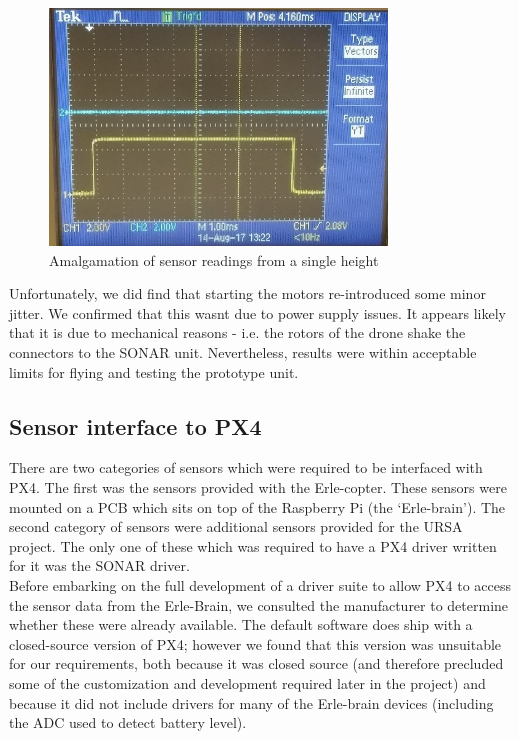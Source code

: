 \documentclass[capstone_report.tex]{subfiles}
\begin{document}
    \begin{figure}[H]
        \centering
        \includegraphics[width=0.8\textwidth]{imgs/pulseOk.jpg}
        \caption{Amalgamation of sensor readings from a single height\label{fig:goodSig}}
    \end{figure}

Unfortunately, we did find that starting the motors re-introduced some minor jitter. We confirmed that this wasnt due to power supply issues. It appears likely that it is due to mechanical reasons - i.e. the rotors of the drone shake the connectors to the SONAR unit. Nevertheless, results were within acceptable limits for flying and testing the prototype unit.


    \subsection{Sensor interface to PX4}
    There are two categories of sensors which were required to be interfaced with PX4. The first was the sensors provided with the Erle-copter. These sensors were mounted on a PCB which sits on top of the Raspberry Pi (the `Erle-brain'). The second category of sensors were additional sensors provided for the URSA project. The only one of these which was required to have a PX4 driver written for it was the SONAR driver.\\

    Before embarking on the full development of a driver suite to allow PX4 to access the sensor data from the Erle-Brain, we consulted the manufacturer to determine whether these were already available. The default software does ship with a closed-source version of PX4; however we found that this version was unsuitable for our requirements, both because it was closed source (and therefore precluded some of the customization and development required later in the project) and because it did not include drivers for many of the Erle-brain devices (including the ADC used to detect battery level).\\
\end{document}
